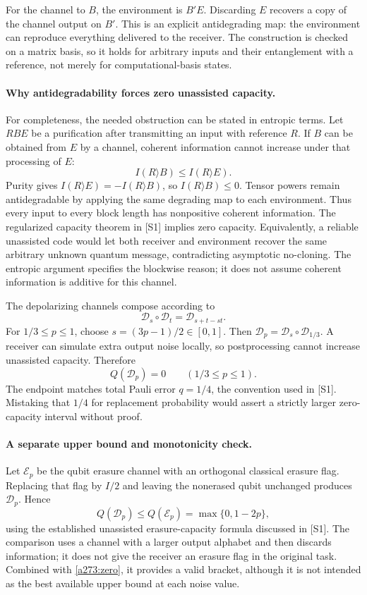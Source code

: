 \documentclass[11pt]{article}
\begin{document}
For the channel to $B$, the environment is $B'E$. Discarding $E$
recovers a copy of the channel output on $B'$. This is an explicit
antidegrading map: the environment can reproduce everything delivered
to the receiver. The construction is checked on a matrix basis, so
it holds for arbitrary inputs and their entanglement with a reference,
not merely for computational-basis states.

\paragraph{Why antidegradability forces zero unassisted capacity.}
For completeness, the needed obstruction can be stated in entropic
terms. Let $RBE$ be a purification after transmitting an input with
reference $R$. If $B$ can be obtained from $E$ by a channel, coherent
information cannot increase under that processing of $E$:
\[
 I(R\rangle B)\le I(R\rangle E).
\]
Purity gives $I(R\rangle E)=-I(R\rangle B)$, so
$I(R\rangle B)\le0$. Tensor powers remain antidegradable by applying
the same degrading map to each environment. Thus every input to every
block length has nonpositive coherent information. The regularized
capacity theorem in [S1] implies zero capacity. Equivalently, a reliable
unassisted code would let both receiver and environment recover the
same arbitrary unknown quantum message, contradicting asymptotic
no-cloning. The entropic argument specifies the blockwise reason;
it does not assume coherent information is additive for this channel.

The depolarizing channels compose according to
\[
 \mathcal D_s\circ\mathcal D_t=\mathcal D_{s+t-st}.
\]
For $1/3\le p\le1$, choose $s=(3p-1)/2\in[0,1]$. Then
$\mathcal D_p=\mathcal D_s\circ\mathcal D_{1/3}$.
A receiver can simulate extra output noise locally, so postprocessing
cannot increase unassisted capacity. Therefore
\begin{equation}\label{a273:zero}
                    Q(\mathcal D_p)=0\qquad(1/3\le p\le1).
\end{equation}
The endpoint matches total Pauli error $q=1/4$, the convention used in
[S1]. Mistaking that $1/4$ for replacement probability would assert a
strictly larger zero-capacity interval without proof.

\paragraph{A separate upper bound and monotonicity check.}
Let $\mathcal E_p$ be the qubit erasure channel with an orthogonal
classical erasure flag. Replacing that flag by $I/2$ and leaving the
nonerased qubit unchanged produces $\mathcal D_p$. Hence
\[
 Q(\mathcal D_p)\le Q(\mathcal E_p)=\max\{0,1-2p\},
\]
using the established unassisted erasure-capacity formula discussed in
[S1]. The comparison uses a channel with a larger output alphabet and
then discards information; it does not give the receiver an erasure
flag in the original task. Combined with \eqref{a273:zero}, it provides
a valid bracket, although it is not intended as the best available
upper bound at each noise value.
\end{document}
